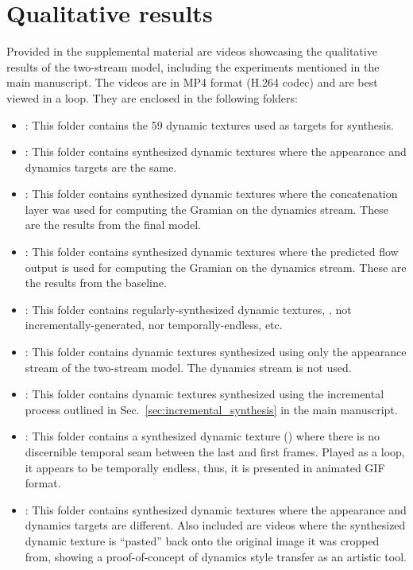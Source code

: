\section{Qualitative results}
Provided in the supplemental material are videos showcasing the qualitative results of the two-stream model, including the experiments mentioned in the main manuscript. The videos are in MP4 format (H.264 codec) and are best viewed in a loop. They are enclosed in the following folders:
\begin{itemize}
	\item {}: This folder contains the 59 dynamic textures used as targets for synthesis.
	\item {}: This folder contains synthesized dynamic textures where the appearance and dynamics targets are the same.
	\item {}: This folder contains synthesized dynamic textures where the concatenation layer was used for computing the Gramian on the dynamics stream. These are the results from the final model.
	\item {}: This folder contains synthesized dynamic textures where the predicted flow output is used for computing the Gramian on the dynamics stream. These are the results from the baseline.
	\item {}: This folder contains regularly-synthesized dynamic textures, \ie, not incrementally-generated, nor temporally-endless, etc.
	\item {}: This folder contains dynamic textures synthesized using only the appearance stream of the two-stream model. The dynamics stream is not used.
	\item {}: This folder contains dynamic textures synthesized using the incremental process outlined in Sec.\ \ref{sec:incremental_synthesis} in the main manuscript.
	\item {}: This folder contains a synthesized dynamic texture () where there is no discernible temporal seam between the last and first frames. Played as a loop, it appears to be temporally endless, thus, it is presented in animated GIF format.
	\item {}: This folder contains synthesized dynamic textures where the appearance and dynamics targets are different. Also included are videos where the synthesized dynamic texture is ``pasted'' back onto the original image it was cropped from, showing a proof-of-concept of dynamics style transfer as an artistic tool.

\end{itemize}
